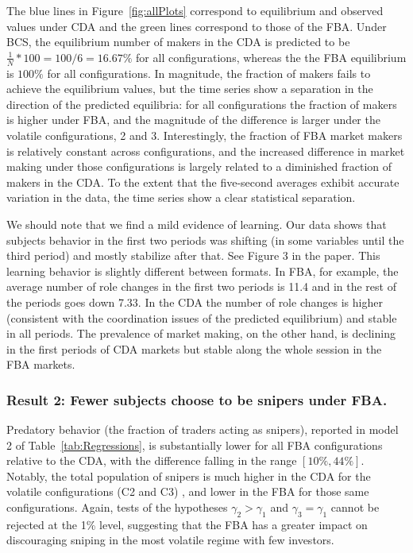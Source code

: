 \documentclass[12pt]{article}
\begin{document}
The blue lines in Figure~\ref{fig:allPlots} correspond to equilibrium and observed values under CDA and the green lines correspond to those of the FBA. Under BCS, the equilibrium number of makers in the CDA is predicted to be $\frac{1}{N}*100 = 100/6 = 16.67\%$ for all configurations, whereas the the FBA equilibrium is $100\%$ for all configurations.
In magnitude, the fraction of makers fails to achieve the equilibrium values, but the time series show a separation in the direction of the predicted equilibria: for all configurations the fraction of makers is higher under FBA, and the magnitude of the difference is larger under the volatile configurations, 2 and 3. Interestingly, the fraction of FBA market makers is relatively constant across configurations, and the increased difference in market making under those configurations is largely related to a diminished fraction of makers in the CDA. To the extent that the five-second averages exhibit accurate variation in the data, the time series show a clear statistical separation.

We should note that we find a mild evidence of learning. Our data shows that subjects behavior in the first two periods was shifting (in some variables until the third period) and mostly stabilize after that. See Figure 3 in the paper. This learning behavior is slightly different between formats. In FBA, for example, the average number of role changes in the first two periods is 11.4 and in the rest of the periods goes down 7.33. In the CDA the number of role changes is higher (consistent with the coordination issues of the predicted equilibrium) and stable in all periods. The prevalence of market making, on the other hand, is declining in the first periods of CDA markets but stable along the whole session in the FBA markets. 

\subsubsection*{Result 2: Fewer subjects choose to be snipers under FBA.}
Predatory behavior (the fraction of traders acting as snipers), reported in model 2 of Table~\ref{tab:Regressions}, is substantially lower for all FBA configurations relative to the CDA, with the difference falling in the range $[10\%,44\%]$.
Notably, the total population of snipers is much higher in the CDA for the volatile configurations (C2 and C3) , and lower in the FBA for those same configurations.
Again, tests of the hypotheses $\gamma_2 > \gamma_1$ and  $\gamma_3=\gamma_1$ cannot be rejected at the 1\% level, suggesting that the FBA has a greater impact on discouraging sniping in the most volatile regime with few investors.
\end{document}
